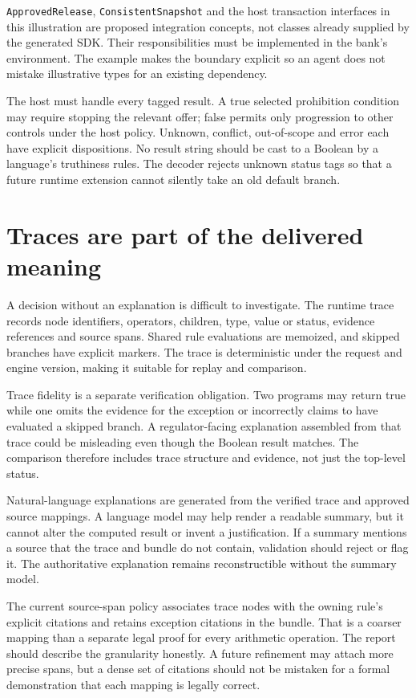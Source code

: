 \documentclass[12pt,a4paper,oneside,openany]{book}
\begin{document}
\texttt{ApprovedRelease}, \texttt{ConsistentSnapshot} and the host transaction
interfaces in this illustration are proposed integration concepts, not classes
already supplied by the generated SDK. Their responsibilities must be implemented
in the bank's environment. The example makes the boundary explicit so an agent
does not mistake illustrative types for an existing dependency.

The host must handle every tagged result. A true selected prohibition condition
may require stopping the relevant offer; false permits only progression to other
controls under the host policy. Unknown, conflict, out-of-scope and error each
have explicit dispositions. No result string should be cast to a Boolean by a
language's truthiness rules. The decoder rejects unknown status tags so that a
future runtime extension cannot silently take an old default branch.

\section{Traces are part of the delivered meaning}

A decision without an explanation is difficult to investigate. The runtime trace
records node identifiers, operators, children, type, value or status, evidence
references and source spans. Shared rule evaluations are memoized, and skipped
branches have explicit markers. The trace is deterministic under the request and
engine version, making it suitable for replay and comparison.

Trace fidelity is a separate verification obligation. Two programs may return
true while one omits the evidence for the exception or incorrectly claims to have
evaluated a skipped branch. A regulator-facing explanation assembled from that
trace could be misleading even though the Boolean result matches. The comparison
therefore includes trace structure and evidence, not just the top-level status.

Natural-language explanations are generated from the verified trace and approved
source mappings. A language model may help render a readable summary, but it
cannot alter the computed result or invent a justification. If a summary mentions
a source that the trace and bundle do not contain, validation should reject or
flag it. The authoritative explanation remains reconstructible without the
summary model.

The current source-span policy associates trace nodes with the owning rule's
explicit citations and retains exception citations in the bundle. That is a
coarser mapping than a separate legal proof for every arithmetic operation. The
report should describe the granularity honestly. A future refinement may attach
more precise spans, but a dense set of citations should not be mistaken for a
formal demonstration that each mapping is legally correct.
\end{document}
